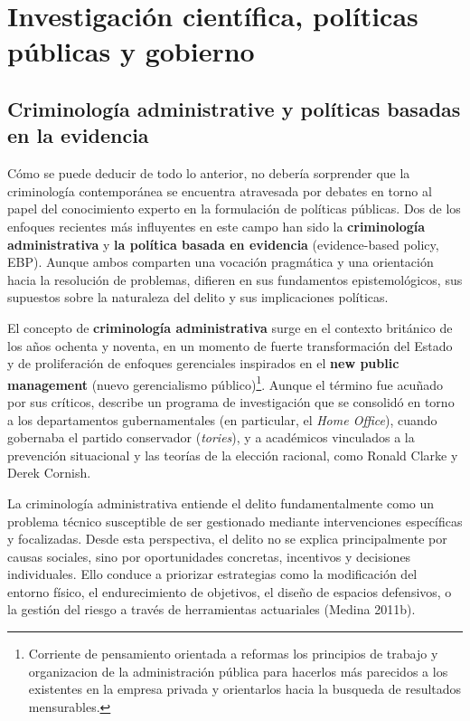 \documentclass[
  spanish,
  letterpaper,
  DIV=11,
  numbers=noendperiod]{scrreprt}
\begin{document}
\section{Investigación científica, políticas públicas y
gobierno}\label{investigaciuxf3n-cientuxedfica-poluxedticas-puxfablicas-y-gobierno}

\subsection{Criminología administrative y políticas basadas en la
evidencia}\label{criminologuxeda-administrative-y-poluxedticas-basadas-en-la-evidencia}

Cómo se puede deducir de todo lo anterior, no debería sorprender que la
criminología contemporánea se encuentra atravesada por debates en torno
al papel del conocimiento experto en la formulación de políticas
públicas. Dos de los enfoques recientes más influyentes en este campo
han sido la \textbf{criminología administrativa} y \textbf{la política
basada en evidencia} (evidence-based policy, EBP). Aunque ambos
comparten una vocación pragmática y una orientación hacia la resolución
de problemas, difieren en sus fundamentos epistemológicos, sus supuestos
sobre la naturaleza del delito y sus implicaciones políticas.

El concepto de \textbf{criminología administrativa} surge en el contexto
británico de los años ochenta y noventa, en un momento de fuerte
transformación del Estado y de proliferación de enfoques gerenciales
inspirados en el \textbf{new public management} (nuevo gerencialismo
público)\footnote{Corriente de pensamiento orientada a reformas los
  principios de trabajo y organizacion de la administración pública para
  hacerlos más parecidos a los existentes en la empresa privada y
  orientarlos hacia la busqueda de resultados mensurables.}. Aunque el
término fue acuñado por sus críticos, describe un programa de
investigación que se consolidó en torno a los departamentos
gubernamentales (en particular, el \emph{Home Office}), cuando gobernaba
el partido conservador (\emph{tories}), y a académicos vinculados a la
prevención situacional y las teorías de la elección racional, como
Ronald Clarke y Derek Cornish.

La criminología administrativa entiende el delito fundamentalmente como
un problema técnico susceptible de ser gestionado mediante
intervenciones específicas y focalizadas. Desde esta perspectiva, el
delito no se explica principalmente por causas sociales, sino por
oportunidades concretas, incentivos y decisiones individuales. Ello
conduce a priorizar estrategias como la modificación del entorno físico,
el endurecimiento de objetivos, el diseño de espacios defensivos, o la
gestión del riesgo a través de herramientas actuariales (Medina 2011b).
\end{document}
